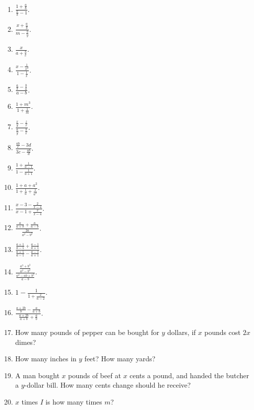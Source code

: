 \documentclass{book}
\begin{document}
\begin{enumerate}
\item $\displaystyle \frac{1+\frac{a}{b}}{\frac{x}{b}-1}$.

\item $\displaystyle \frac{x+\frac{a}{y}}{m-\frac{b}{y}}$.

\item $\displaystyle \frac{x}{a+\frac{b}{c}}$.

\item $\displaystyle \frac{x-\frac{1}{x^2}}{1-\frac{1}{x}}$.

\item $\displaystyle \frac{\frac{a}{b}-\frac{b}{a}}{a-b}$.

\item $\displaystyle \frac{1+m^3}{1+\frac{1}{m}}$.

\item $\displaystyle
\frac{\frac{x}{y}-\frac{z}{x}}{\frac{a}{y}-\frac{b}{x}}$.

\item $\displaystyle \frac{\frac{ab}{c}-3d}{3c-\frac{ab}{d}}$.

\item $\displaystyle \frac{1+\frac{1}{a-1}}{1-\frac{1}{a+1}}$.

\item $\frac{1+a+a^2}{1+\frac{1}{a}+\frac{1}{a^2}}$.

\item $\displaystyle \frac{x-3-\frac{2}{x-4}}{x-1+\frac{2}{x-4}}$.

\item $\displaystyle
\frac{\frac{a}{a+b}+\frac{a}{a-b}}{\frac{2a}{a^2-b^2}}$.

\item $\displaystyle
\frac{\frac{a+1}{a-1}+\frac{a-1}{a+1}}{\frac{a+1}{a-1}-\frac{a-1}{a+1}}$.

\item $\displaystyle
\frac{\frac{a^3+b^3}{a^2-b^2}}{\frac{a^2-ab+b^2}{a-b}}$.

\item $\displaystyle 1-\frac{1}{1+\frac{2}{a-2}}$.

\item $\displaystyle
\frac{\frac{a+2b}{b}-\frac{a}{a+b}}{\frac{a+2b}{a+b}+\frac{a}{b}}$.

\item How many pounds of pepper can be bought for $y$ dollars, if
$x$ pounds cost $2x$ dimes?

\item How many inches in $y$ feet? How many yards?

\item A man bought $x$ pounds of beef at $x$ cents a pound,
and handed the butcher a $y$-dollar bill. How many cents
change should he receive?

\item $x$ times $I$ is how many times $m$?
\end{enumerate}
\end{document}
